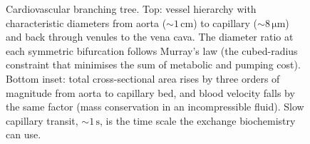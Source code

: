 \begin{figure}[htbp]
\caption{Cardiovascular branching tree. Top: vessel hierarchy with
characteristic diameters from aorta ($\sim 1\,\text{cm}$) to capillary
($\sim 8\,\si{\micro\meter}$) and back through venules to the vena
cava. The diameter ratio at each symmetric bifurcation follows
Murray's law (the cubed-radius constraint that minimises the sum of
metabolic and pumping cost). Bottom inset: total cross-sectional area
rises by three orders of magnitude from aorta to capillary bed, and
blood velocity falls by the same factor (mass conservation in an
incompressible fluid). Slow capillary transit, $\sim 1\,\text{s}$, is
the time scale the exchange biochemistry can use.}
\label{fig:vol06ch06:cv-tree}
\end{figure}

